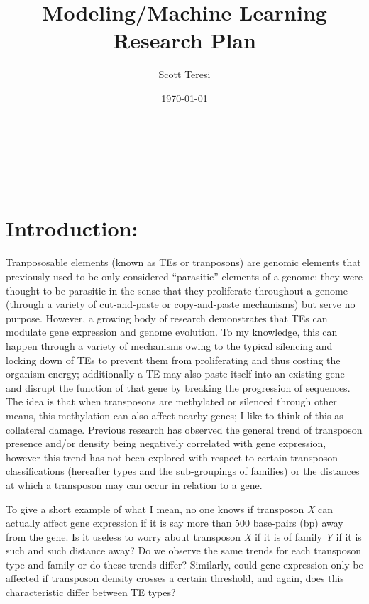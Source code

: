 \documentclass[12pt,letterpaper]{article}
\date{\today}
\author{Scott Teresi}
\title{Modeling/Machine Learning Research Plan}
\begin{document}
\begin{flushright}
\small
\textbf{\@author}\\
\@title\\
\@date\\
\end{flushright}

\makeatother
\normalsize
\section*{Introduction:}
Tranpososable elements (known as TEs or tranposons) are genomic elements that previously used to be only considered ``parasitic'' elements of a genome; they were thought to be parasitic in the sense that they proliferate throughout a genome (through a variety of cut-and-paste or copy-and-paste mechanisms) but serve no purpose. However, a growing body of research demonstrates that TEs can modulate gene expression and genome evolution. To my knowledge, this can happen through a variety of mechanisms owing to the typical silencing and locking down of TEs to prevent them from proliferating and thus costing the organism energy; additionally a TE may also paste itself into an existing gene and disrupt the function of that gene by breaking the progression of sequences. \\

The idea is that when transposons are methylated or silenced through other means, this methylation can also affect nearby genes; I like to think of this as collateral damage. Previous research has observed the general trend of transposon presence and/or density being negatively correlated with gene expression, however this trend has not been explored with respect to certain transposon classifications (hereafter types and the sub-groupings of families) or the distances at which a transposon may can occur in relation to a gene.

To give a short example of what I mean, no one knows if transposon \textit{X} can actually affect gene expression if it is say more than 500 base-pairs (bp) away from the gene. Is it useless to worry about transposon \textit{X} if it is of family \textit{Y} if it is such and such distance away? Do we observe the same trends for each transposon type and family or do these trends differ? Similarly, could gene expression only be affected if transposon density crosses a certain threshold, and again, does this characteristic differ between TE types?\\
\end{document}
